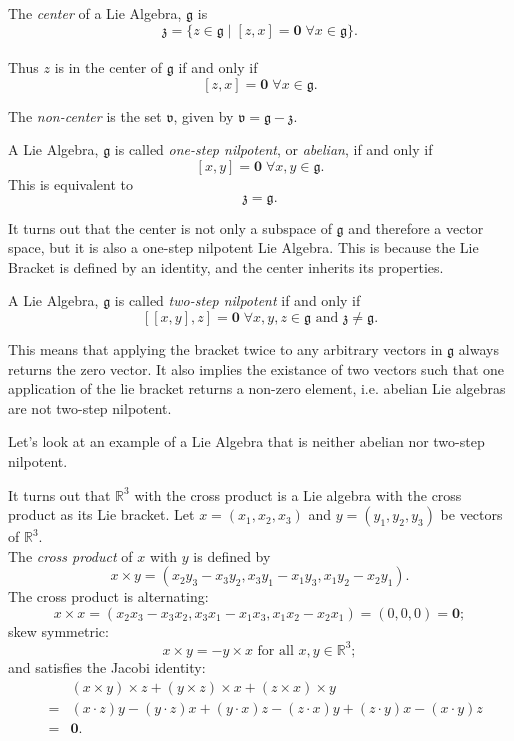 \documentclass[11 pt]{article}
\newcommand{\br}[2]{\left[#1,#2\right]}
\newcommand{\R}{\mathbb{R}}
\newcommand{\fg}{\mathfrak{g}}
\newcommand{\fz}{\mathfrak{z}}
\newcommand{\fv}{\mathfrak{v}}
\newcommand{\zvec}{\mathbf{0}}
\newcommand{\RR}{\mathbb{R}}
\begin{document}
\begin{definition}
    The \emph{center} of a Lie Algebra, $\fg$ is
    \\\[\fz=\{z \in \fg \mid [z,x]
    = \zvec \; \forall x \in \fg\}.\]
    \\Thus $z$ is in the center of $\fg$ if and only if
    \\\[[z,x] = \zvec \; \forall x \in \fg.\]

    The \emph{non-center} is the set $\fv$, given by $\fv = \fg - \fz$.
\end{definition}

\begin{definition}
    A Lie Algebra, $\fg$ is called \emph{one-step nilpotent}, or \emph{abelian}, if and only if
    \[\br{x}{y} = \zvec \; \forall x,y \in \fg. \]
    This is equivalent to \[\fz = \fg.\]
\end{definition}

It turns out that the center is not only a subspace of $\fg$ and therefore a
vector space, but it is also a one-step nilpotent Lie Algebra.  This is
because the Lie Bracket is defined by an identity, and the center inherits its
properties.

\begin{definition}
    A Lie Algebra, $\fg$ is called \emph{two-step nilpotent} if and only if
    \[
        [[x,y],z] = \zvec \; \forall x,y,z \in \fg
        \text{ and } \fz \neq \fg.
    \]
\end{definition}
This means that applying the bracket twice to any arbitrary vectors in $\fg$
always returns the zero vector.  It also implies the existance of two vectors
such that one application of the lie bracket returns a non-zero element, i.e.
abelian Lie algebras are not two-step nilpotent.

Let's look at an example of a Lie Algebra that is neither abelian nor two-step
nilpotent.

\begin{example}
    It turns out that $\RR^3$ with the cross product is a Lie algebra with the
    cross product as its Lie bracket.
    Let $x = (x_1, x_2, x_3)$ and $y = (y_1, y_2, y_3)$ be vectors of $\RR^3$.
    \\The \emph{cross product} of $x$ with $y$ is defined by
    $$
    x \times y = (x_2y_3 - x_3y_2, x_3y_1 - x_1y_3, x_1y_2 - x_2y_1).
    $$
    The cross product is alternating:
    $$
    x \times x = (x_2x_3 - x_3x_2, x_3x_1 - x_1x_3, x_1x_2 - x_2x_1)
    = (0, 0, 0)
    = \zvec;
    $$
    skew symmetric:
    $$
    x \times y = - y \times x \text{\ \ for\ all\ } x,y \in \R^3;
    $$
    and satisfies the Jacobi identity:
    \begin{eqnarray*}
    & & (x \times y) \times z + (y \times z) \times x + (z \times x) \times y
    \\ & = &
    (x \cdot z)y - (y \cdot z)x + (y\cdot x)z - (z \cdot x)y +
    (z \cdot y)x - (x \cdot y)z
    \\ & = & \zvec.
    \end{eqnarray*}
\end{example}
\end{document}
